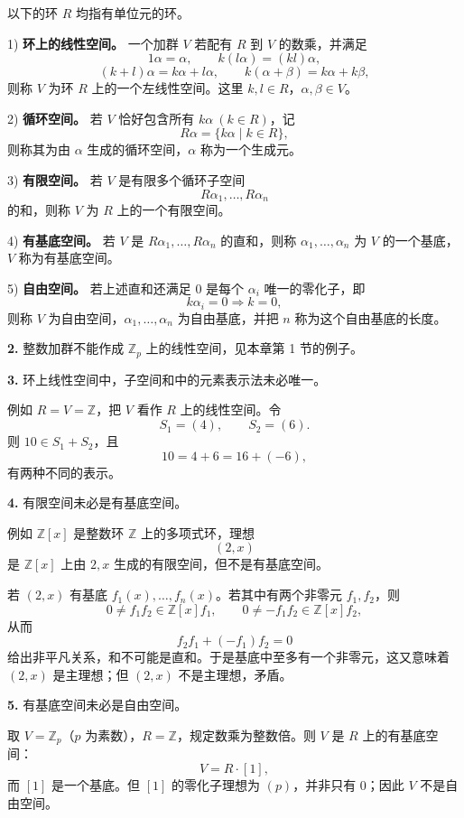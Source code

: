 以下的环 $R$ 均指有单位元的环。

1) \textbf{环上的线性空间。} 一个加群 $V$ 若配有 $R$ 到 $V$ 的数乘，并满足
\[
1\alpha=\alpha,
\qquad
k(l\alpha)=(kl)\alpha,
\]
\[
(k+l)\alpha=k\alpha+l\alpha,
\qquad
k(\alpha+\beta)=k\alpha+k\beta,
\]
则称 $V$ 为环 $R$ 上的一个左线性空间。这里 $k,l\in R$，$\alpha,\beta\in V$。

2) \textbf{循环空间。} 若 $V$ 恰好包含所有 $k\alpha\ (k\in R)$，记
\[
R\alpha=\{k\alpha\mid k\in R\},
\]
则称其为由 $\alpha$ 生成的循环空间，$\alpha$ 称为一个生成元。

3) \textbf{有限空间。} 若 $V$ 是有限多个循环子空间
\[
R\alpha_1,\ldots,R\alpha_n
\]
的和，则称 $V$ 为 $R$ 上的一个有限空间。

4) \textbf{有基底空间。} 若 $V$ 是 $R\alpha_1,\ldots,R\alpha_n$ 的直和，则称 $\alpha_1,\ldots,\alpha_n$ 为 $V$ 的一个基底，$V$ 称为有基底空间。

5) \textbf{自由空间。} 若上述直和还满足 $0$ 是每个 $\alpha_i$ 唯一的零化子，即
\[
k\alpha_i=0\Longrightarrow k=0,
\]
则称 $V$ 为自由空间，$\alpha_1,\ldots,\alpha_n$ 为自由基底，并把 $n$ 称为这个自由基底的长度。

\textbf{2.} 整数加群不能作成 $\mathbb Z_p$ 上的线性空间，见本章第 1 节的例子。

\textbf{3.} 环上线性空间中，子空间和中的元素表示法未必唯一。

例如 $R=V=\mathbb Z$，把 $V$ 看作 $R$ 上的线性空间。令
\[
S_1=(4),\qquad S_2=(6).
\]
则 $10\in S_1+S_2$，且
\[
10=4+6=16+(-6),
\]
有两种不同的表示。

\textbf{4.} 有限空间未必是有基底空间。

例如 $\mathbb Z[x]$ 是整数环 $\mathbb Z$ 上的多项式环，理想
\[
(2,x)
\]
是 $\mathbb Z[x]$ 上由 $2,x$ 生成的有限空间，但不是有基底空间。

若 $(2,x)$ 有基底 $f_1(x),\ldots,f_n(x)$。若其中有两个非零元 $f_1,f_2$，则
\[
0\ne f_1f_2\in\mathbb Z[x]f_1,
\qquad
0\ne -f_1f_2\in\mathbb Z[x]f_2,
\]
从而
\[
f_2f_1+(-f_1)f_2=0
\]
给出非平凡关系，和不可能是直和。于是基底中至多有一个非零元，这又意味着 $(2,x)$ 是主理想；但 $(2,x)$ 不是主理想，矛盾。

\textbf{5.} 有基底空间未必是自由空间。

取 $V=\mathbb Z_p$（$p$ 为素数），$R=\mathbb Z$，规定数乘为整数倍。则 $V$ 是 $R$ 上的有基底空间：
\[
V=R\cdot[1],
\]
而 $[1]$ 是一个基底。但 $[1]$ 的零化子理想为 $(p)$，并非只有 $0$；因此 $V$ 不是自由空间。

